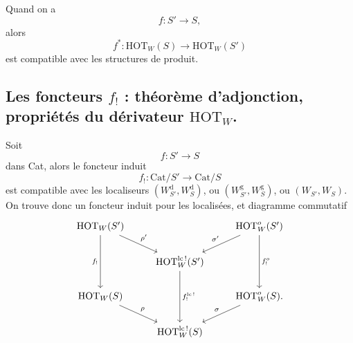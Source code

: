 Quand on a
\[
f : S' \longrightarrow S,
\]
alors
\[
f^* : \mathrm{HOT}_W(S) \longrightarrow \mathrm{HOT}_W(S')
\]
est compatible avec les structures de produit.

\subsection*{\protect{} Les foncteurs $f_!$ : théorème d'adjonction, propriétés du dérivateur $\mathrm{HOT}_W$.}

Soit
\[
f : S' \longrightarrow S
\]
dans Cat, alors le foncteur induit
\[
f_! : \mathrm{Cat}/S' \longrightarrow \mathrm{Cat}/S
\]
est compatible avec les localiseurs $(W_{S'}^{\mathrm{d}}, W_S^{\mathrm{d}})$, ou $(W_{S'}^{\mathrm{g}}, W_S^{\mathrm{g}})$, ou $(W_{S'}, W_S)$. On trouve donc un foncteur induit pour les localisées, et diagramme commutatif
\[
\begin{tikzcd}[column sep=small]
\mathrm{HOT}_W(S') \arrow[rrd, "\rho'"] \arrow[dd, "f_!"'] & & & & \mathrm{HOT}^{o}_W(S') \arrow[lld, "\sigma'"'] \arrow[dd, "f^{o}_!"] \\
& & \mathrm{HOT}^{\mathrm{lc}\,!}_W(S') \arrow[dd, "f^{\mathrm{lc}\,!}_!"] & & \\
\mathrm{HOT}_W(S) \arrow[rrd, "\rho"] & & & & \mathrm{HOT}^{o}_W(S). \arrow[lld, "\sigma"'] \\
& & \mathrm{HOT}^{\mathrm{lc}\,!}_W(S) & &
\end{tikzcd}
\]

